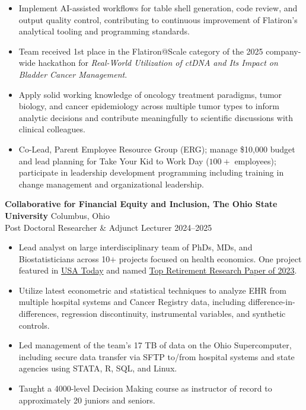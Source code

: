 \begin{itemize}
    \item Implement AI-assisted workflows for table shell generation, code review, and output quality control, contributing to continuous improvement of Flatiron's analytical tooling and programming standards.
    \item Team received 1st place in the Flatiron@Scale category of the 2025 company-wide hackathon for \textit{Real-World Utilization of ctDNA and Its Impact on Bladder Cancer Management}.
    \item Apply solid working knowledge of oncology treatment paradigms, tumor biology, and cancer epidemiology across multiple tumor types to inform analytic decisions and contribute meaningfully to scientific discussions with clinical colleagues.
    \item Co-Lead, Parent Employee Resource Group (ERG); manage \$10,000 budget and lead planning for Take Your Kid to Work Day ($100+$ employees); participate in leadership development programming including training in change management and organizational leadership.
\end{itemize}

\bigskip
\textbf{Collaborative for Financial Equity and Inclusion, The Ohio State University} \hfill Columbus, Ohio \\
Post Doctoral Researcher \& Adjunct Lecturer \hfill 2024--2025
\begin{itemize}
    \itemsep0em
    \item Lead analyst on large interdisciplinary team of PhDs, MDs, and Biostatisticians across 10$+$ projects focused on health economics. One project featured in \href{https://www.usatoday.com/story/money/2024/04/26/spouse-dies-credit-score-effect/73424579007/}{\color{lightblue}USA Today} and named \href{https://www.thinkadvisor.com/2023/12/26/cfp-board-picks-7-best-retirement-research-papers-of-2023/}{\color{lightblue}Top Retirement Research Paper of 2023}.
    \item Utilize latest econometric and statistical techniques to analyze EHR from multiple hospital systems and Cancer Registry data, including difference-in-differences, regression discontinuity, instrumental variables, and synthetic controls.
    \item Led management of the team's 17 TB of data on the Ohio Supercomputer, including secure data transfer via SFTP to/from hospital systems and state agencies using STATA, R, SQL, and Linux.
    \item Taught a 4000-level Decision Making course as instructor of record to approximately 20 juniors and seniors.
\end{itemize}

